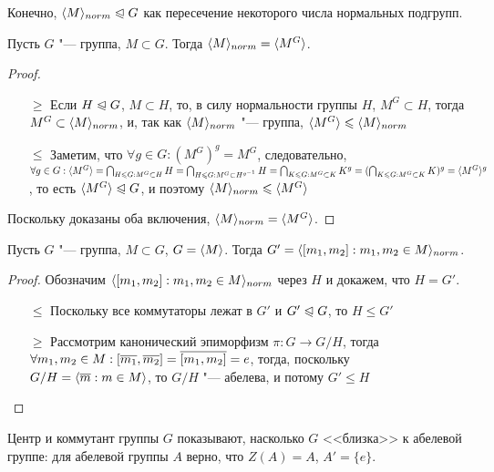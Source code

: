 \begin{note}
	Конечно, $\langle M\rangle_{norm} \trianglelefteqslant G$ как пересечение некоторого числа нормальных подгрупп.
\end{note}

\begin{proposition}
	Пусть $G$ "--- группа, $M \subset G$. Тогда $\gl M\gr_{norm}\hm = \gl M^G\gr$.
\end{proposition}

\begin{proof}~
	\begin{itemize}
		\item[$\ge$] Если $H \trianglelefteqslant G$, $M \subset H$, то, в силу нормальности группы $H$, $M^G \subset H$, тогда $M^G \hm\subset \gl M\gr_{norm}$, и, так как $\langle M\rangle_{norm}$ "--- группа, $\langle M^G\rangle \leqslant \langle M\rangle_{norm}$
		
		\item[$\le$] Заметим, что $\forall g \in G: (M^G)^g = M^G$, следовательно, $\forall g \in G: \gl M^G\gr \hm= \bigcap_{H \le G: M^G \subset H}H \hm= \bigcap_{H\le G: M^G \subset H^{g^{-1}}}H \hm= \bigcap_{K \le G: M^G \subset K}K^g \hm= (\bigcap_{K \le G: M^G \subset K}K)^g = \gl M^G\gr^g$, то есть $\langle M^G\rangle \trianglelefteqslant G$, и поэтому $\langle M\rangle_{norm} \leqslant \langle M^G\rangle$
	\end{itemize}
	Поскольку доказаны оба включения, $\langle M\rangle_{norm} = \langle M^G\rangle$.
\end{proof}

\begin{proposition}
	Пусть $G$ "--- группа, $M \subset G$, $G = \langle M\rangle$. Тогда $G' = \gl [m_1, m_2]: m_1, m_2 \hm\in M\gr_{norm}$.
\end{proposition}

\begin{proof}
	Обозначим $\langle[m_1, m_2]: m_1, m_2 \in M\rangle_{norm}$ через $H$ и докажем, что $H = G'$.
	\begin{itemize}
		\item[$\le$] Поскольку все коммутаторы лежат в $G'$ и $G' \trianglelefteqslant G$, то $H \le G'$
		
		\item[$\ge$] Рассмотрим канонический эпиморфизм $\pi: G \to G/ H$, тогда $\forall m_1, m_2 \in M: [\overline{m_1}, \overline{m_2}] \hm= \overline{[m_1, m_2]} = e$, тогда, поскольку $G / H \hm= \gl \overline{m}: m \in M\gr$, то $G / H$ "--- абелева, и потому $G' \le H$
	\end{itemize}
\end{proof}

\begin{note}
	Центр и коммутант группы $G$ показывают, насколько $G$ <<близка>> к абелевой группе: для абелевой группы $A$ верно, что $Z(A) = A$, $A' = \{e\}$.
\end{note}